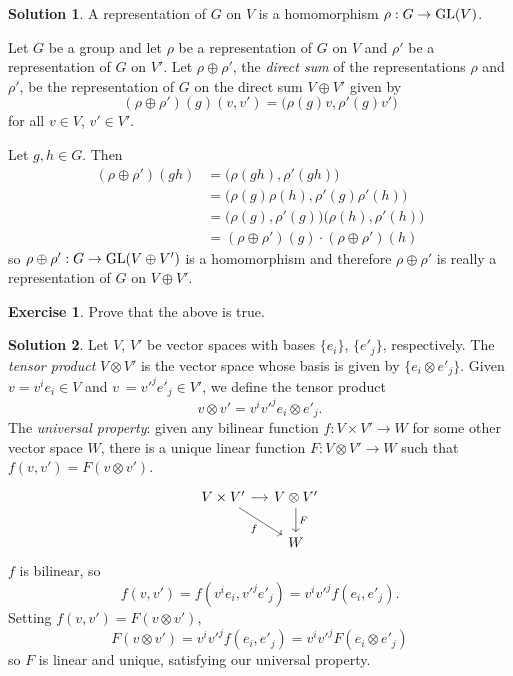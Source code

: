 \documentclass[11pt, a4paper]{report}
\theoremstyle{definition}
\newtheorem{ex}{Exercise}[part]
\newtheorem{sol}{Solution}[part]
\newcommand*{\GL}{\ensuremath\text{GL}}
\begin{document}
\begin{sol}

A representation of $G$ on $V$ is a homomorphism $\rho: G \to \GL(V)$.

Let $G$ be a group and let $\rho$ be a representation of $G$ on $V$ and $\rho'$ be a representation of $G$ on $V'$.
Let $\rho \oplus \rho'$, the \emph{direct sum} of the representations $\rho$ and $\rho'$, be the representation of $G$ on the direct sum $V \oplus V'$ given by
\[
    (\rho \oplus \rho')(g)(v, v') = \bigl( \rho(g) v, \rho'(g) v' \bigr)
\]
for all $v \in V$, $v' \in V'$.

Let $g, h \in G$. Then
\begin{align*}
    (\rho \oplus \rho')(gh) &= \bigl( \rho(gh), \rho'(gh) \bigr) \\
        &= \bigl( \rho(g) \rho(h), \rho'(g) \rho'(h) \bigr) \\
        &= \bigl( \rho(g), \rho'(g) \bigr) \bigl( \rho(h), \rho'(h) \bigr) \\
        &= (\rho \oplus \rho')(g) \cdot (\rho \oplus \rho')(h)
\end{align*}
so $\rho \oplus \rho': G \to \GL(V \oplus V')$ is a homomorphism and therefore $\rho \oplus \rho'$ is really a representation of $G$ on $V \oplus V'$.

\end{sol}

\begin{ex}

Prove that the above is true.

\end{ex}

\begin{sol}

Let $V$, $V'$ be vector spaces with bases $\{e_i\}$, $\{e'_j\}$, respectively.
The \emph{tensor product} $V \otimes V'$ is the vector space whose basis is given by $\{e_i \otimes e'_j\}$.
Given $v = v^i e_i \in V$ and $v\ = v'^j e'_j \in V'$, we define the tensor product
\[
    v \otimes v' = v^i v'^j e_i \otimes e'_j.
\]
The \emph{universal property}: given any bilinear function $f: V \times V' \to W$ for some other vector space $W$, there is a unique linear function $F: V \otimes V' \to W$ such that $f(v, v') = F(v \otimes v')$.
\[
    \begin{tikzcd}[column sep=small]
        V \times V' \rar{} \drar[swap]{f} & V \otimes V' \dar{F} \\
                                          & W
    \end{tikzcd}
\]
$f$ is bilinear, so
\[
    f(v, v') = f(v^i e_i, v'^j e'_j) = v^i v'^j f(e_i, e'_j).
\]
Setting $f(v, v') = F(v \otimes v')$,
\[
    F(v \otimes v') = v^i v'^j f(e_i, e'_j) = v^i v'^j F( e_i \otimes e'_j)
\]
so $F$ is linear and unique, satisfying our universal property.

\end{sol}
\end{document}
